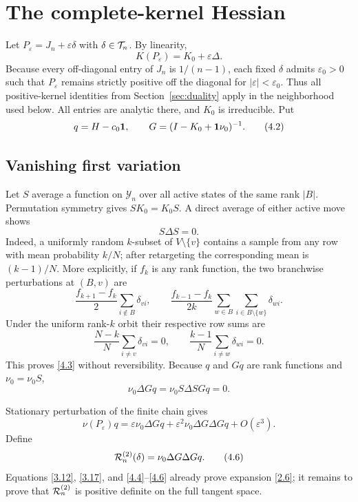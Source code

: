 \section{The complete-kernel Hessian}\label{sec:hessian}

Let $P_\varepsilon=J_n+\varepsilon\delta$ with
$\delta\in\mathcal T_n$.  By linearity,
\[
 K(P_\varepsilon)=K_0+\varepsilon\Delta.                    \tag{4.1}\label{4.1}
\]
Because every off-diagonal entry of $J_n$ is $1/(n-1)$, each fixed
$\delta$ admits $\varepsilon_0>0$ such that $P_\varepsilon$ remains strictly
positive off the diagonal for $|\varepsilon|<\varepsilon_0$.  Thus all
positive-kernel identities from Section~\ref{sec:duality} apply in the
neighborhood used below.  All entries are analytic there, and $K_0$ is
irreducible.  Put
\[
 q=H-c_0\mathbf 1,\qquad
 G=(I-K_0+\mathbf 1\nu_0)^{-1}.                                  \tag{4.2}\label{4.2}
\]

\subsection{Vanishing first variation}

Let $S$ average a function on $\mathcal Y_n$ over all active states of the
same rank $|B|$.  Permutation symmetry gives $SK_0=K_0S$.  A direct average
of either active move shows
\[
 S\Delta S=0.                                               \tag{4.3}\label{4.3}
\]
Indeed, a uniformly random $k$-subset of $V\setminus\{v\}$ contains a
sample from any row with mean probability $k/N$; after retargeting the
corresponding mean is $(k-1)/N$.  More explicitly, if $f_k$ is any rank
function, the two branchwise perturbations at $(B,v)$ are
\[
 \frac{f_{k+1}-f_k}{2}\sum_{i\notin B}\delta_{vi},\qquad
 \frac{f_{k-1}-f_k}{2k}
   \sum_{w\in B}\sum_{i\in B\setminus\{w\}}\delta_{wi}.    \tag{4.3a}\label{4.3a}
\]
Under the uniform rank-$k$ orbit their respective row sums are
\[
 \frac{N-k}{N}\sum_{i\ne v}\delta_{vi}=0,\qquad
 \frac{k-1}{N}\sum_{i\ne w}\delta_{wi}=0.                \tag{4.3b}\label{4.3b}
\]
This proves \eqref{4.3} without reversibility.  Because $q$ and $Gq$ are rank functions
and $\nu_0=\nu_0S$,
\[
 \nu_0\Delta Gq=\nu_0S\Delta SGq=0.                         \tag{4.4}\label{4.4}
\]

Stationary perturbation of the finite chain gives
\[
 \nu(P_\varepsilon)q
 =\varepsilon\nu_0\Delta Gq
  +\varepsilon^2\nu_0\Delta G\Delta Gq+O(\varepsilon^3).
                                                                    \tag{4.5}\label{4.5}
\]
Define
\[
 \mathcal R^{(2)}_{n}(\delta)=\nu_0\Delta G\Delta Gq.                    \tag{4.6}\label{4.6}
\]
Equations \eqref{3.12}, \eqref{3.17}, and \eqref{4.4}--\eqref{4.6}
already prove expansion \eqref{2.6}; it remains to prove that
$\mathcal R^{(2)}_{n}$ is positive definite on the full tangent space.


